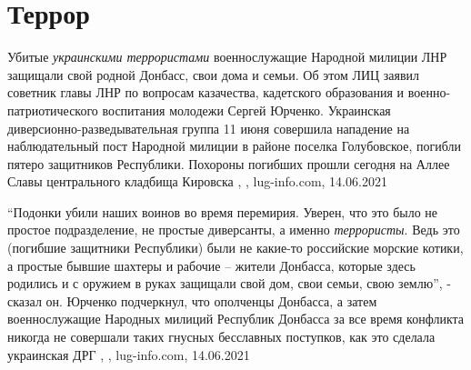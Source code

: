  
 
 
 
 
\chapter{Террор}
\label{sec:slova.terror}

Убитые \emph{украинскими террористами} военнослужащие Народной милиции ЛНР защищали
свой родной Донбасс, свои дома и семьи. Об этом ЛИЦ заявил советник главы ЛНР
по вопросам казачества, кадетского образования и военно-патриотического
воспитания молодежи Сергей Юрченко. Украинская диверсионно-разведывательная
группа 11 июня совершила нападение на наблюдательный пост Народной милиции в
районе поселка Голубовское, погибли пятеро защитников Республики. Похороны
погибших прошли сегодня на Аллее Славы центрального кладбища Кировска
, , lug-info.com, 14.06.2021

\enquote{Подонки убили наших воинов во время перемирия. Уверен, что это было не
простое подразделение, не простые диверсанты, а именно \emph{террористы}. Ведь
это (погибшие защитники Республики) были не какие-то российские морские котики,
а простые бывшие шахтеры и рабочие – жители Донбасса, которые здесь родились и
с оружием в руках защищали свой дом, свои семьи, свою землю}, - сказал он.
Юрченко подчеркнул, что ополченцы Донбасса, а затем военнослужащие Народных
милиций Республик Донбасса за все время конфликта никогда не совершали таких
гнусных бесславных поступков, как это сделала украинская ДРГ
, , lug-info.com, 14.06.2021

